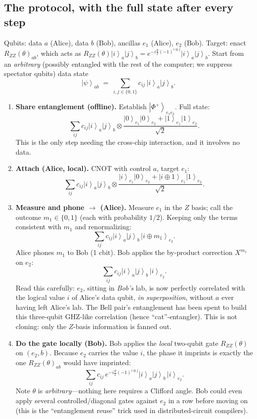 \documentclass[11pt]{article}
\newcommand{\ket}[1]{\left|#1\right\rangle}
\newcommand{\Phip}{\ket{\Phi^{+}}}
\newcommand{\RZZ}{R_{ZZ}}
\begin{document}
\subsection{The protocol, with the full state after every step}

Qubits: data $a$ (Alice), data $b$ (Bob), ancillas $e_1$ (Alice), $e_2$
(Bob). Target: enact $\RZZ(\theta)_{ab}$, which acts as
$\RZZ(\theta)\ket{i}_a\ket{j}_b
 = e^{-i\frac{\theta}{2}(-1)^{i\oplus j}}\ket{i}_a\ket{j}_b$.
Start from an \emph{arbitrary} (possibly entangled with the rest of the
computer; we suppress spectator qubits) data state
\[
\ket{\psi}_{ab} \;=\; \sum_{i,j\in\{0,1\}} c_{ij}\,\ket{i}_a \ket{j}_b .
\]

\begin{enumerate}[leftmargin=2em, itemsep=0.6em]

\item \textbf{Share entanglement (offline).} Establish
$\Phip_{e_1 e_2}$. Full state:
\[
\sum_{ij} c_{ij} \ket{i}_a \ket{j}_b \otimes
\frac{\ket{0}_{e_1}\ket{0}_{e_2} + \ket{1}_{e_1}\ket{1}_{e_2}}{\sqrt{2}} .
\]
This is the only step needing the cross-chip interaction, and it involves no
data.

\item \textbf{Attach (Alice, local).} CNOT with control $a$, target $e_1$:
\[
\sum_{ij} c_{ij} \ket{i}_a \ket{j}_b \otimes
\frac{\ket{i}_{e_1}\ket{0}_{e_2} + \ket{i\oplus 1}_{e_1}\ket{1}_{e_2}}{\sqrt{2}} .
\]

\item \textbf{Measure and phone $\rightarrow$ (Alice).} Measure $e_1$ in the
$Z$ basis; call the outcome $m_1 \in \{0,1\}$ (each with probability $1/2$).
Keeping only the terms consistent with $m_1$ and renormalizing:
\[
\sum_{ij} c_{ij} \ket{i}_a \ket{j}_b \,\ket{i \oplus m_1}_{e_2} .
\]
Alice phones $m_1$ to Bob (1 cbit). Bob applies the by-product correction
$X^{m_1}$ on $e_2$:
\[
\sum_{ij} c_{ij} \ket{i}_a \ket{j}_b \,\ket{i}_{e_2} .
\]
Read this carefully: $e_2$, sitting in \emph{Bob's} lab, is now perfectly
correlated with the logical value $i$ of Alice's data qubit, \emph{in
superposition}, without $a$ ever having left Alice's lab. The Bell pair's
entanglement has been spent to build this three-qubit
GHZ-like correlation (hence ``cat''-entangler). This is not cloning: only the
$Z$-basis information is fanned out.

\item \textbf{Do the gate locally (Bob).} Bob applies the \emph{local}
two-qubit gate $\RZZ(\theta)$ on $(e_2, b)$. Because $e_2$ carries the value
$i$, the phase it imprints is exactly the one $\RZZ(\theta)_{ab}$ would have
imprinted:
\[
\sum_{ij} c_{ij}\, e^{-i\frac{\theta}{2}(-1)^{i\oplus j}}
\ket{i}_a \ket{j}_b \,\ket{i}_{e_2} .
\]
Note $\theta$ is \emph{arbitrary}---nothing here requires a Clifford angle.
Bob could even apply several controlled/diagonal gates against $e_2$ in a row
before moving on (this is the ``entanglement reuse'' trick used in
distributed-circuit compilers).


\end{enumerate}
\end{document}
